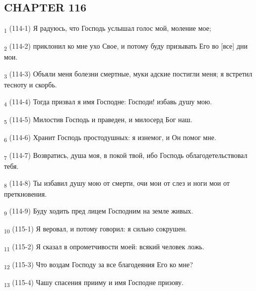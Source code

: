 \subsection{CHAPTER 116}
\begin{tcolorbox}
\textsubscript{1} (114-1) Я радуюсь, что Господь услышал голос мой, моление мое;
\end{tcolorbox}
\begin{tcolorbox}
\textsubscript{2} (114-2) приклонил ко мне ухо Свое, и потому буду призывать Его во [все] дни мои.
\end{tcolorbox}
\begin{tcolorbox}
\textsubscript{3} (114-3) Объяли меня болезни смертные, муки адские постигли меня; я встретил тесноту и скорбь.
\end{tcolorbox}
\begin{tcolorbox}
\textsubscript{4} (114-4) Тогда призвал я имя Господне: Господи! избавь душу мою.
\end{tcolorbox}
\begin{tcolorbox}
\textsubscript{5} (114-5) Милостив Господь и праведен, и милосерд Бог наш.
\end{tcolorbox}
\begin{tcolorbox}
\textsubscript{6} (114-6) Хранит Господь простодушных: я изнемог, и Он помог мне.
\end{tcolorbox}
\begin{tcolorbox}
\textsubscript{7} (114-7) Возвратись, душа моя, в покой твой, ибо Господь облагодетельствовал тебя.
\end{tcolorbox}
\begin{tcolorbox}
\textsubscript{8} (114-8) Ты избавил душу мою от смерти, очи мои от слез и ноги мои от преткновения.
\end{tcolorbox}
\begin{tcolorbox}
\textsubscript{9} (114-9) Буду ходить пред лицем Господним на земле живых.
\end{tcolorbox}
\begin{tcolorbox}
\textsubscript{10} (115-1) Я веровал, и потому говорил: я сильно сокрушен.
\end{tcolorbox}
\begin{tcolorbox}
\textsubscript{11} (115-2) Я сказал в опрометчивости моей: всякий человек ложь.
\end{tcolorbox}
\begin{tcolorbox}
\textsubscript{12} (115-3) Что воздам Господу за все благодеяния Его ко мне?
\end{tcolorbox}
\begin{tcolorbox}
\textsubscript{13} (115-4) Чашу спасения прииму и имя Господне призову.
\end{tcolorbox}
